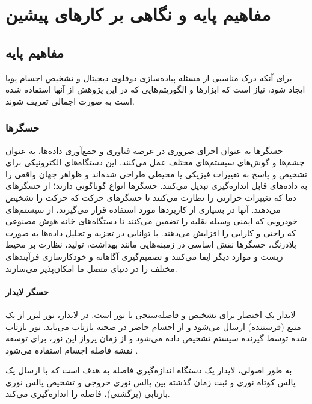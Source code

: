 \chapter{مفاهیم پایه و نگاهی بر کارهای پیشین}

\section{مفاهیم پایه}
برای آنکه درک مناسبی از مسئله‌ پیاده‌سازی دوقلوی دیجیتال و تشخیص اجسام پویا ایجاد شود، نیاز است که ابزار‌ها و الگوریتم‌هایی که در این پژوهش از آنها استفاده شده است به صورت اجمالی تعریف شوند.

\subsection{حسگرها}
حسگرها به عنوان اجزای ضروری در عرصه فناوری و جمع‌آوری داده‌ها، به عنوان چشم‌ها و گوش‌های سیستم‌های مختلف عمل می‌کنند. این دستگاه‌های الکترونیکی برای تشخیص و پاسخ به تغییرات فیزیکی یا محیطی طراحی شده‌اند و ظواهر جهان واقعی را به داده‌های قابل اندازه‌گیری تبدیل می‌کنند. حسگرها انواع گوناگونی دارند؛ از حسگرهای دما که تغییرات حرارتی را نظارت می‌کنند تا حسگرهای حرکت که حرکت را تشخیص می‌دهند. آنها در بسیاری از کاربردها مورد استفاده قرار می‌گیرند، از سیستم‌های خودرویی که ایمنی وسیله نقلیه را تضمین می‌کنند تا دستگاه‌های خانه هوش مصنوعی که راحتی و کارایی را افزایش می‌دهند. با توانایی در تجزیه و تحلیل داده‌ها به صورت بلادرنگ، حسگرها نقش اساسی در زمینه‌هایی مانند بهداشت، تولید، نظارت بر محیط زیست و موارد دیگر ایفا می‌کنند و تصمیم‌گیری آگاهانه و خودکارسازی فرآیندهای مختلف را در دنیای متصل ما امکان‌پذیر می‌سازند.

\subsubsection{حسگر لایدار}
لایدار یک اختصار برای تشخیص و فاصله‌سنجی با نور است. در لایدار، نور لیزر از یک منبع (فرستنده) ارسال می‌شود و از اجسام حاضر در صحنه بازتاب می‌یابد. نور بازتاب شده توسط گیرنده سیستم تشخیص داده می‌شود و از زمان پرواز این نور، برای توسعه نقشه فاصله اجسام استفاده می‌شود \cite{Synopsis:LiDAR}.


به طور اصولی، لایدار یک دستگاه اندازه‌گیری فاصله به هدف است که با ارسال یک پالس کوتاه نوری و ثبت زمان گذشته بین پالس نوری خروجی و تشخیص پالس نوری بازتابی (برگشتی)، فاصله را اندازه‌گیری می‌کند.

